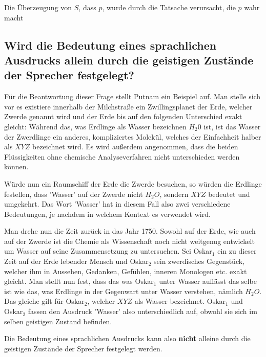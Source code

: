\documentclass[a4paper]{article}
\begin{document}
\begin{center}
    Die Überzeugung von $S$, dass $p$, wurde durch die Tatsache verursacht, die $p$ wahr macht \cite{gettier1}
\end{center}

\setcounter{section}{7}
\setcounter{subsection}{0}
\subsection{Wird die Bedeutung eines sprachlichen Ausdrucks allein durch die geistigen Zustände der Sprecher festgelegt?}
Für die Beantwortung dieser Frage stellt Putnam \cite{putnam} ein Beispiel auf. Man stelle sich vor es existiere innerhalb der Milchstraße ein Zwillingsplanet der Erde, welcher Zwerde genannt wird und der Erde bis auf den folgenden Unterschied exakt gleicht: Während das, was Erdlinge als Wasser bezeichnen $H_2 0$ ist, ist das Wasser der Zwerdlinge ein anderes, kompliziertes Molekül, welches der Einfachheit halber als $XYZ$ bezeichnet wird. Es wird außerdem angenommen, dass die beiden Flüssigkeiten ohne chemische Analyseverfahren nicht unterschieden werden können.

Würde nun ein Raumschiff der Erde die Zwerde besuchen, so würden die Erdlinge festellen, dass 'Wasser' auf der Zwerde nicht $H_2 O$, sondern $XYZ$ bedeutet und umgekehrt. Das Wort 'Wasser' hat in diesem Fall also zwei verschiedene Bedeutungen, je nachdem in welchem Kontext es verwendet wird.

Man drehe nun die Zeit zurück in das Jahr 1750. Sowohl auf der Erde, wie auch auf der Zwerde ist die Chemie als Wissenschaft noch nicht weitgenug entwickelt um Wasser auf seine Zusammensetzung zu untersuchen. Sei Oskar$_1$ ein zu dieser Zeit auf der Erde lebender Mensch und Oskar$_2$ sein zwerdisches Gegenstück, welcher ihm in Aussehen, Gedanken, Gefühlen, inneren Monologen etc. exakt gleicht. Man stellt nun fest, dass das was Oskar$_1$ unter Wasser auffässt das selbe ist wie das, was Erdlinge in der Gegenwart unter Wasser verstehen, nämlich $H_2 O$. Das gleiche gilt für Oskar$_2$, welcher $XYZ$ als Wasser bezeichnet. Oskar$_1$ und Oskar$_2$ fassen den Ausdruck 'Wasser' also unterschiedlich auf, obwohl sie sich im selben geistigen Zustand befinden.

Die Bedeutung eines sprachlichen Ausdrucks kann also \textbf{nicht} alleine durch die geistigen Zustände der Sprecher festgelegt werden.



\end{document}
